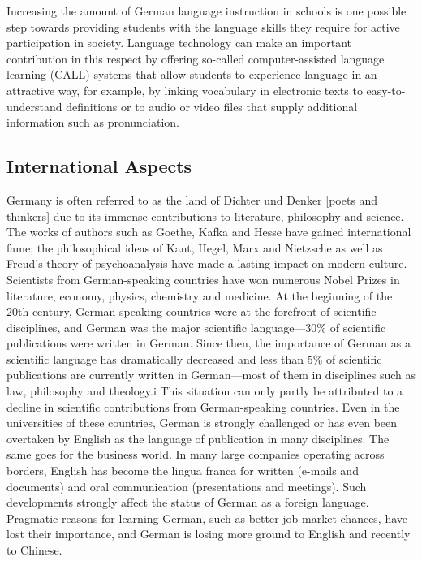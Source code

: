 \documentclass[]{../metanetpaper}
\begin{document}
Increasing the amount of German language instruction in schools is one possible step towards providing students with the language skills they require for active participation in society. Language technology can make an important contribution in this respect by offering so-called computer-assisted language learning (CALL) systems that allow students to experience language in an attractive way, for example, by linking vocabulary in electronic texts to easy-to-understand definitions or to audio or video files that supply additional information such as pronunciation. 

	\subsection{International Aspects}
Germany is often referred to as the land of Dichter und Denker [poets and thinkers] due to its immense contributions to literature, philosophy and science. The works of authors such as Goethe, Kafka and Hesse have gained international fame; the philosophical ideas of Kant, Hegel, Marx and Nietzsche as well as Freud's theory of psychoanalysis have made a lasting impact on modern culture. Scientists from German-speaking countries have won numerous Nobel Prizes in literature, economy, physics, chemistry and medicine.
At the beginning of the 20th century, German-speaking countries were at the forefront of scientific disciplines, and German was the major scientific language—30\% of scientific publications were written in German. Since then, the importance of German as a scientific language has dramatically decreased and less than 5\% of scientific publications are currently written in German—most of them in disciplines such as law, philosophy and theology.i This situation can only partly be attributed to a decline in scientific contributions from German-speaking countries. Even in the universities of these countries, German is strongly challenged or has even been overtaken by English as the language of publication in many disciplines.
The same goes for the business world. In many large companies operating across borders, English has become the lingua franca for written (e-mails and documents) and oral communication (presentations and meetings). Such developments strongly affect the status of German as a foreign language. Pragmatic reasons for learning German, such as better job market chances, have lost their importance, and German is losing more ground to English and recently to Chinese. 
\end{document}
